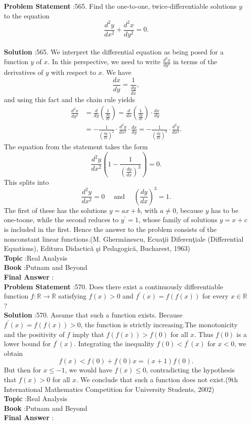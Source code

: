 \documentclass[10pt]{article}
\begin{document}
\textbf{Problem Statement} :565. Find the one-to-one, twice-differentiable solutions $y$ to the equation$$ \frac{d^{2} y}{d x^{2}}+\frac{d^{2} x}{d y^{2}}=0 . $$\\
\textbf{Solution} :565. We interpret the differential equation as being posed for a function $y$ of $x$. In this perspective, we need to write $\frac{d^{2} x}{d y^{2}}$ in terms of the derivatives of $y$ with respect to $x$. We have$$ \frac{d x}{d y}=\frac{1}{\frac{d y}{d x}}, $$and using this fact and the chain rule yields$$ \begin{aligned} \frac{d^{2} x}{d y^{2}} &=\frac{d}{d y}\left(\frac{1}{\frac{d y}{d x}}\right)=\frac{d}{d x}\left(\frac{1}{\frac{d y}{d x}}\right) \cdot \frac{d x}{d y} \\ &=-\frac{1}{\left(\frac{d y}{d x}\right)^{2}} \cdot \frac{d^{2} y}{d x^{2}} \cdot \frac{d x}{d y}=-\frac{1}{\left(\frac{d y}{d x}\right)^{3}} \cdot \frac{d^{2} y}{d x^{2}} . \end{aligned} $$The equation from the statement takes the form$$ \frac{d^{2} y}{d x^{2}}\left(1-\frac{1}{\left(\frac{d y}{d x}\right)^{3}}\right)=0 . $$This splits into$$ \frac{d^{2} y}{d x^{2}}=0 \quad \text { and } \quad\left(\frac{d y}{d x}\right)^{3}=1 . $$The first of these has the solutions $y=a x+b$, with $a \neq 0$, because $y$ has to be one-toone, while the second reduces to $y^{\prime}=1$, whose family of solutions $y=x+c$ is included in the first. Hence the answer to the problem consists of the nonconstant linear functions.(M. Ghermănescu, Ecuaţii Diferenţiale (Differential Equations), Editura Didactică şi Pedagogică, Bucharest, 1963)\\
\textbf{Topic} :Real Analysis\\
\textbf{Book} :Putnam and Beyond\\
\textbf{Final Answer} :\\


\textbf{Problem Statement} :570. Does there exist a continuously differentiable function $f: \mathbb{R} \rightarrow \mathbb{R}$ satisfying $f(x)>0$ and $f^{\prime}(x)=f(f(x))$ for every $x \in \mathbb{R}$ ? \\
\textbf{Solution} :570. Assume that such a function exists. Because $f^{\prime}(x)=f(f(x))>0$, the function is strictly increasing.The monotonicity and the positivity of $f$ imply that $f(f(x))>f(0)$ for all $x$. Thus $f(0)$ is a lower bound for $f^{\prime}(x)$. Integrating the inequality $f(0)<f^{\prime}(x)$ for $x<0$, we obtain$$ f(x)<f(0)+f(0) x=(x+1) f(0) . $$But then for $x \leq-1$, we would have $f(x) \leq 0$, contradicting the hypothesis that $f(x)>0$ for all $x$. We conclude that such a function does not exist.(9th International Mathematics Competition for University Students, 2002)\\
\textbf{Topic} :Real Analysis\\
\textbf{Book} :Putnam and Beyond\\
\textbf{Final Answer} :\\
\end{document}
